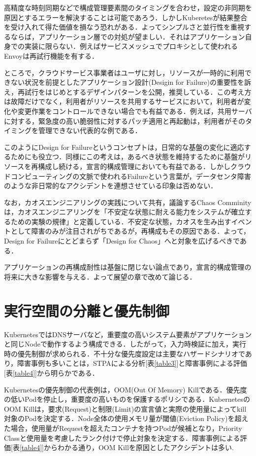 \documentclass[12pt,a4j]{ujreport}
\begin{document}
高精度な時刻同期などで構成管理要素間のタイミングを合わせ，設定の非同期を原因とするエラーを解決することは可能であろう．しかしKuberetesが結果整合を受け入れて得た価値を損なう恐れがある．よってシンプルさと並行性を重視するならば，アプリケーション層での対処が望ましい．それはアプリケーション自身での実装に限らない．例えばサービスメッシュでプロキシとして使われるEnvoyは再試行機能を有する\cite{ref34}．

ところで，クラウドサービス事業者はユーザに対し，リソースが一時的に利用できない状況を前提としたアプリケーション設計(Desigin for Failure)の重要性を訴え，再試行をはじめとするデザインパターンを公開，推奨している\cite{ref35,ref36}．この考え方は故障だけでなく，利用者がリソースを共用するサービスにおいて，利用者が変化や変更作業をコントロールできない場合でも有益である．例えば，共用サーバに対する，緊急度の高い脆弱性に対するパッチ適用と再起動は，利用者がそのタイミングを管理できない代表的な例である．

このようにDesign for Failureというコンセプトは，日常的な基盤の変化に適応するためにも役立つ．同様にこの考えは，あるべき状態を維持するために基盤がリソースを再構成し続ける，宣言的構成管理においても有益である．しかしクラウドコンピューティングの文脈で使われるFailureという言葉が，データセンタ障害のような非日常的なアクシデントを連想させている印象は否めない．

なお，カオスエンジニアリングの実践について共有，議論するChaos Comminityは，カオスエンジニアリングを「不安定な状態に耐える能力をシステムが確立するための実験の規律」と定義している\cite{ref37}．不安定な状態，カオスを生み出すイベントとして障害のみが注目されがちであるが，再構成もその原因である．よって，Design for Failureにとどまらず「Design for Chaos」へと対象を広げるべきである．

アプリケーションの再構成耐性は基盤に閉じない論点であり，宣言的構成管理の将来に大きな影響を与える．よって展望の章で改めて論じる．

\section{実行空間の分離と優先制御}
KubernetesではDNSサーバなど，重要度の高いシステム要素がアプリケーションと同じNodeで動作するよう構成できる．したがって，入力時検証に加え，実行時の優先制御が求められる．不十分な優先度設定は主要なハザードシナリオであり，障害事例も多いことは，STPAによる分析[表\ref{table3}]と障害事例による評価[表\ref{table4}]から明らかである．

Kubernetesの優先制御の代表例は，OOM(Out Of Memory) Killである．優先度の低いPodを停止し，重要度の高いものを保護するポリシである．KubernetesのOOM Killは，要求(Request)と制限(Limit)の宣言値と実際の使用量によってkill対象のPodを決定する．Node全体の使用メモリ量が閾値(Eviction Policy)を超えた場合，使用量がRequestを超えたコンテナを持つPodが候補となり，Priority Classと使用量を考慮したランク付けで停止対象を決定する．障害事例による評価[表\ref{table4}]からわかる通り，OOM Killを原因としたアクシデントは多い.
\end{document}
